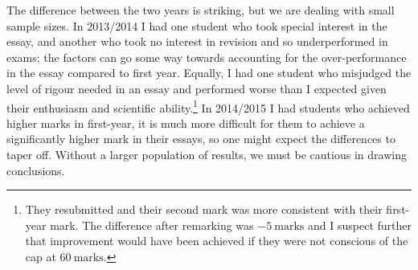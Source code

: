 The difference between the two years is striking, but we are dealing with small sample sizes. In 2013/2014 I had one student who took special interest in the essay, and another who took no interest in revision and so underperformed in exams; the factors can go some way towards accounting for the over-performance in the essay compared to first year. Equally, I had one student who misjudged the level of rigour needed in an essay and performed worse than I expected given their enthusiasm and scientific ability.\footnote{They resubmitted and their second mark was more consistent with their first-year mark. The difference after remarking was $-5~\mathrm{marks}$ and I suspect further that improvement would have been achieved if they were not conscious of the cap at $60~\mathrm{marks}$.} In 2014/2015 I had students who achieved higher marks in first-year, it is much more difficult for them to achieve a significantly higher mark in their essays, so one might expect the differences to taper off. Without a larger population of results, we must be cautious in drawing conclusions.

